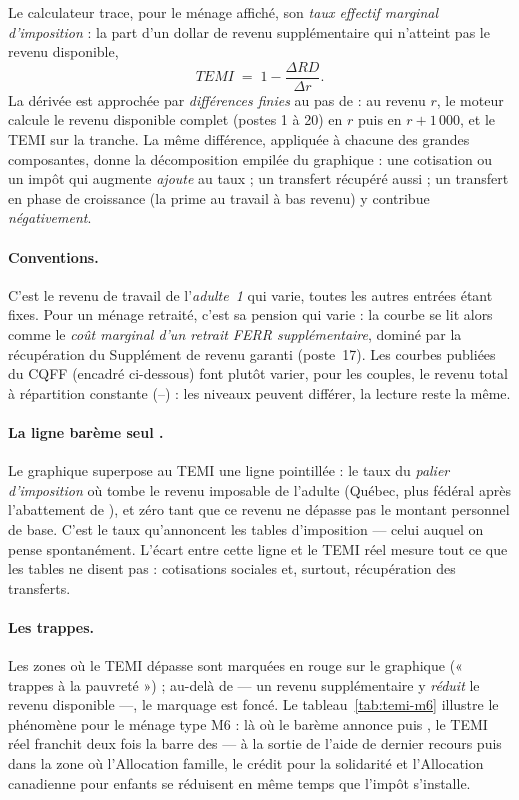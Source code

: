 Le calculateur trace, pour le ménage affiché, son \emph{taux effectif
marginal d'imposition} : la part d'un dollar de revenu supplémentaire qui
n'atteint pas le revenu disponible,
\begin{equation}
\label{eq:temi}
TEMI \;=\; 1 - \frac{\Delta RD}{\Delta r}.
\end{equation}
La dérivée est approchée par \emph{différences finies} au pas de  :
au revenu $r$, le moteur calcule le revenu disponible complet (postes 1 à
20) en $r$ puis en $r + 1\,000$, et le TEMI sur la tranche. La même
différence, appliquée à chacune des grandes composantes, donne la
décomposition empilée du graphique : une cotisation ou un impôt qui
augmente \emph{ajoute} au taux ; un transfert récupéré aussi ; un transfert
en phase de croissance (la prime au travail à bas revenu) y contribue
\emph{négativement}.

\paragraph{Conventions.} C'est le revenu de travail de l'\emph{adulte~1}
qui varie, toutes les autres entrées étant fixes. Pour un ménage retraité,
c'est sa pension qui varie : la courbe se lit alors comme le \emph{coût
marginal d'un retrait FERR supplémentaire}, dominé par la récupération du
Supplément de revenu garanti (poste~17). Les courbes publiées du CQFF
(encadré ci-dessous) font plutôt varier, pour les couples, le revenu total
à répartition constante (--) : les niveaux peuvent différer,
la lecture reste la même.

\paragraph{La ligne \og barème seul \fg{}.} Le graphique superpose au TEMI
une ligne pointillée : le taux du \emph{palier d'imposition} où tombe le
revenu imposable de l'adulte (Québec, plus fédéral après l'abattement de
), et zéro tant que ce revenu ne dépasse pas le montant personnel
de base. C'est le taux qu'annoncent les tables d'imposition --- celui
auquel on pense spontanément. L'écart entre cette ligne et le TEMI réel
mesure tout ce que les tables ne disent pas : cotisations sociales et,
surtout, récupération des transferts.

\paragraph{Les trappes.} Les zones où le TEMI dépasse  sont
marquées en rouge sur le graphique (« trappes à la pauvreté ») ; au-delà de
 --- un revenu supplémentaire y \emph{réduit} le revenu disponible
---, le marquage est foncé. Le tableau~\ref{tab:temi-m6} illustre le
phénomène pour le ménage type M6 : là où le barème annonce  puis
, le TEMI réel franchit deux fois la barre des  --- à la
sortie de l'aide de dernier recours puis dans la zone où l'Allocation
famille, le crédit pour la solidarité et l'Allocation canadienne pour
enfants se réduisent en même temps que l'impôt s'installe.

